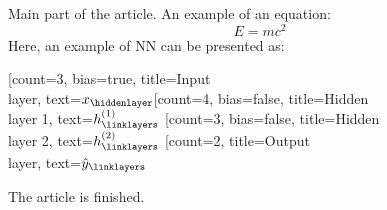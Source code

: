 \documentclass[]{article}
\title{}
\author{}
\begin{document}
\maketitle

\begin{abstract}
Text of this abstract
\end{abstract}
Main part of the article. An example of an equation:
\[E=mc^2\]
Here, an example of NN can be presented as:

\begin{neuralnetwork}[height=4]
	\newcommand{\x}[2]{$x_#2$}
	\newcommand{\y}[2]{$\hat{y}_#2$}
	\newcommand{\hfirst}[2]{\small $h^{(1)}_#2$}
	\newcommand{\hsecond}[2]{\small $h^{(2)}_#2$}
	[count=3, bias=true, title=Input\\layer, text=\x]
	\hiddenlayer[count=4, bias=false, title=Hidden\\layer 1, text=\hfirst] \linklayers
	\hiddenlayer[count=3, bias=false, title=Hidden\\layer 2, text=\hsecond] \linklayers
	\outputlayer[count=2, title=Output\\layer, text=\y] \linklayers
\end{neuralnetwork}

The article is finished.
\end{document}
